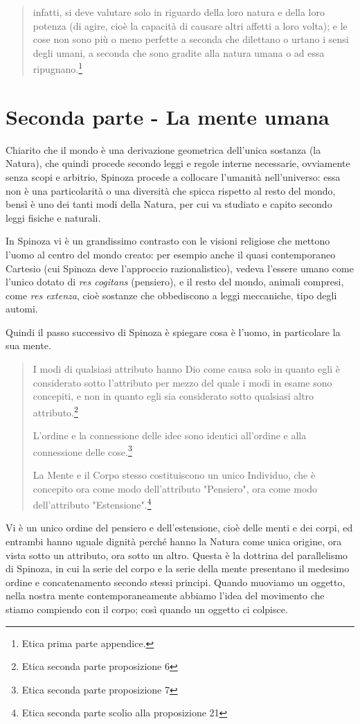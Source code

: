 \begin{quotation}
	infatti, si deve valutare solo in riguardo della loro natura e della loro potenza (di agire, cioè la capacità  di causare altri affetti a loro volta); e le cose non
	sono più o meno perfette a seconda che dilettano o urtano i sensi degli umani, a seconda
	che sono gradite alla natura umana o ad essa ripugnano.\footnote{Etica prima parte appendice.}
	
\end{quotation}
\newpage
\section{Seconda parte - La mente umana}
Chiarito che il mondo è una derivazione geometrica dell'unica sostanza (la Natura), che quindi procede secondo leggi e regole interne necessarie, ovviamente senza scopi e arbitrio, Spinoza procede a collocare l'umanità nell'universo: essa non è una particolarità o una diversità che spicca rispetto al resto del mondo, bensì è uno dei tanti modi della Natura, per cui va studiato e capito secondo leggi fisiche e naturali.

In Spinoza vi è un grandissimo contrasto con le visioni religiose che mettono l'uomo al centro del mondo creato: per esempio anche il quasi contemporaneo Cartesio (cui Spinoza deve l'approccio razionalistico), vedeva l'essere umano come l'unico dotato di \textit{res cogitans} (pensiero), e il resto del mondo, animali compresi, come \textit{res extenza}, cioè sostanze che obbediscono a leggi meccaniche, tipo degli automi.

Quindi il passo successivo di Spinoza è spiegare cosa è l'uomo, in particolare la sua mente.
\begin{quotation}
	\small I modi di qualsiasi attributo hanno Dio come causa solo in quanto egli è considerato sotto l’attributo per mezzo del quale i modi in esame sono concepiti, e non in quanto egli sia considerato sotto qualsiasi altro attributo.\footnote{Etica seconda parte proposizione 6}
	
	\small L’ordine e la connessione delle idee sono identici all’ordine e alla connessione delle cose.\footnote{Etica seconda parte proposizione 7}
	
	\small La Mente e il Corpo stesso costituiscono un unico Individuo,
	che è concepito ora come modo dell’attributo "Pensiero", ora come modo dell’attributo "Estensione".\footnote{Etica seconda parte scolio alla proposizione 21}
\end{quotation}
Vi è un unico ordine del pensiero e dell'estensione, cioè delle menti e dei corpi, ed entrambi hanno uguale dignità perché hanno la Natura come unica origine, ora vista sotto un attributo, ora sotto un altro. Questa è la dottrina del parallelismo di Spinoza, in cui la serie del corpo e la serie della mente presentano il medesimo ordine e concatenamento secondo stessi principi. Quando muoviamo un oggetto, nella nostra mente contemporaneamente abbiamo l'idea del movimento che stiamo compiendo con il corpo; così quando un oggetto ci colpisce.


